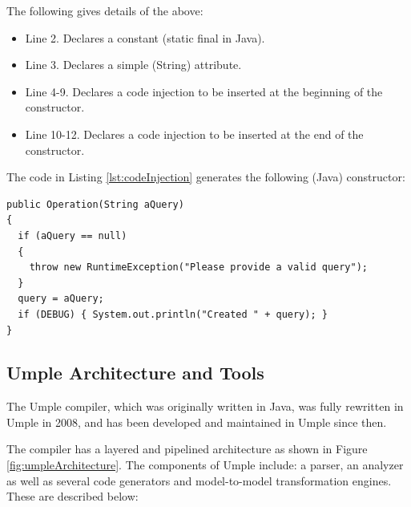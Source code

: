The following gives details of the above:
\begin{itemize}
\item Line 2. Declares a constant (static final in Java). 
\item Line 3. Declares a simple (String) attribute.   	 
\item Line 4-9. Declares a code injection to be inserted at the beginning of the constructor.  
\item Line 10-12. Declares a code injection to be inserted at the end of the constructor.      
\end{itemize}

The code in Listing \ref{lst:codeInjection} generates the following (Java) constructor:

\begin{lstlisting}[style=java, caption=Generated constructor after code injection]
public Operation(String aQuery)
{
  if (aQuery == null)  
  {  
    throw new RuntimeException("Please provide a valid query");  
  }
  query = aQuery;
  if (DEBUG) { System.out.println("Created " + query); }
} 
\end{lstlisting}

\subsection{Umple Architecture and Tools}

The Umple compiler, which was originally written in Java, was fully rewritten in Umple in 2008, and has been developed and maintained in Umple since then. 

The compiler has a layered and pipelined architecture as shown in Figure \ref{fig:umpleArchitecture}. 
The components of Umple include: a parser, an analyzer as well as several code generators and model-to-model transformation engines. These are described below:

